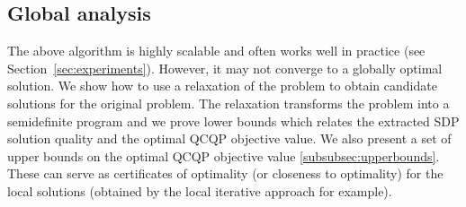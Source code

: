\subsection{Global analysis}\label{subsec:globalanalysis}
The above algorithm is highly scalable and often works well in
practice (see Section~\ref{sec:experiments}).
However, it may not converge to a globally optimal
solution.  We show how to use a relaxation of the problem to obtain
candidate solutions for the original problem. The relaxation
transforms the problem into a  semidefinite program and we
 prove  lower bounds which
relates the extracted SDP solution quality and the optimal QCQP
objective value. We also present a set of upper bounds on the optimal QCQP objective value \ref{subsubsec:upperbounds}.
These can serve as certificates of optimality (or closeness to
optimality) for the local solutions (obtained by the local iterative approach for example).

